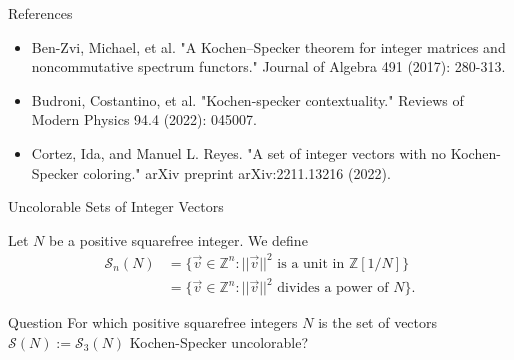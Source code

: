 \documentclass[11pt]{beamer}
\begin{document}
\begin{frame}{References}

\begin{itemize}

\item Ben-Zvi, Michael, et al. "A Kochen–Specker theorem for integer matrices and noncommutative spectrum functors." Journal of Algebra 491 (2017): 280-313.

\item Budroni, Costantino, et al. "Kochen-specker contextuality." Reviews of Modern Physics 94.4 (2022): 045007.

\item Cortez, Ida, and Manuel L. Reyes. "A set of integer vectors with no Kochen-Specker coloring." arXiv preprint arXiv:2211.13216 (2022).

\end{itemize}

\end{frame}

{
	\begin{frame}{}
	\end{frame}
}
{
	\begin{frame}{}
	\end{frame}
}
\begin{frame}{Uncolorable Sets of Integer Vectors}

Let $N$ be a positive squarefree integer. We define
\begin{equation*}
	\begin{split}
		\mathcal{S}_{n} (N) &= \{\vec{v} \in \mathbb{Z}^{n} : ||\vec{v}||^{2} \text{ is a unit in } \mathbb{Z}[1/N]\} \\
		&= \{\vec{v} \in \mathbb{Z}^{n} : ||\vec{v}||^{2} \text{ divides a power of } N\}.
	\end{split}
\end{equation*}

\begin{alertblock}{Question}
	For which positive squarefree integers $N$ is the set of vectors $\mathcal{S}(N) := \mathcal{S}_{3} (N)$ Kochen-Specker uncolorable?
\end{alertblock}

\end{frame}
\end{document}
